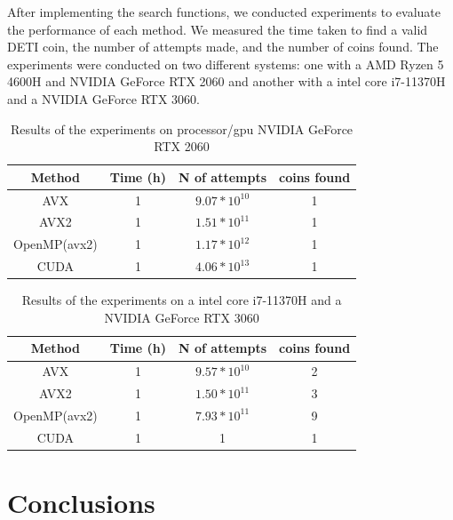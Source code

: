 \documentclass[a4paper,12pt]{article}
\begin{document}
After implementing the search functions, we conducted experiments to evaluate the performance
of each method. We measured the time taken to find a valid DETI coin, the number of attempts
made, and the number of coins found. The experiments were conducted on two different systems:
one with a AMD Ryzen 5 4600H and NVIDIA GeForce RTX 2060 and another with a intel core i7-11370H and a NVIDIA GeForce RTX 
3060.

\begin{table}[H]
    \centering
    \begin{tabular}{|c|c|c|c|}
        \hline
        \textbf{Method} & \textbf{Time (h)} & \textbf{N of attempts} & \textbf{coins found} \\
        \hline
        AVX & 1 & $9.07*10^{10}$ & 1  \\
        AVX2 & 1 & $1.51*10^{11}$ & 1 \\
        OpenMP(avx2) & 1 & $1.17*10^{12}$ & 1 \\
        CUDA & 1 & $4.06*10^{13}$ & 1  \\
        \hline
    \end{tabular}
    \caption{Results of the experiments on processor/gpu NVIDIA GeForce RTX 2060}
    \label{tab:results1}
\end{table}

\begin{table}[H]
    \centering
    \begin{tabular}{|c|c|c|c|}
        \hline
        \textbf{Method} & \textbf{Time (h)} & \textbf{N of attempts} & \textbf{coins found} \\
        \hline
        AVX & 1 & $9.57*10^{10}$ & 2  \\
        AVX2 & 1 &  $1.50*10^{11}$ & 3 \\
        OpenMP(avx2) & 1 & $7.93*10^{11}$ & 9 \\
        CUDA & 1 & 1 & 1  \\
        \hline
    \end{tabular}
    \caption{Results of the experiments on a intel core i7-11370H and a NVIDIA GeForce RTX 3060}
    \label{tab:results2}
\end{table}



\section{Conclusions}
\label{sec:discussion}
\end{document}
